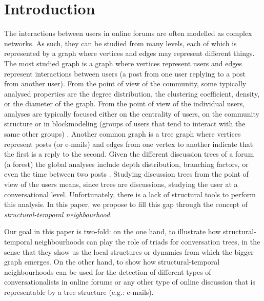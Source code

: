 \documentclass[conference]{IEEEtran}
\begin{document}
\section{Introduction}
The interactions between users in online forums are often modelled as complex networks. As such, they can be studied from many levels, each of which is represented by a graph where vertices and edges may represent different things. The most studied graph is a graph where vertices represent users and edges represent interactions between users (a post from one user replying to a post from another user). From the point of view of the community, some typically analysed properties are the degree distribution, the clustering coefficient, density, or the diameter of the graph. From the point of view of the individual users, analyses are typically focused either on the centrality of users, on the community structure or in blockmodeling (groups of users that tend to interact with the same other groups) \cite{McCallum2007a}. Another common graph is a tree graph where vertices represent posts (or e-mails) and edges from one vertex to another indicate that the first is a reply to the second. Given the different discussion trees of a forum (a forest) the global analyses include depth distribution, branching factors, or even the time between two posts \cite{Bhatt2012}. Studying discussion trees from the point of view of the users means, since trees are discussions, studying the user at a conversational level. Unfortunately, there is a lack of structural tools to perform this analysis. In this paper, we propose to fill this gap through the concept of \textit{structural-temporal neighbourhood}.  

Our goal in this paper is two-fold: on the one hand, to illustrate how structural-temporal neighbourhoods can play the role of triads for conversation trees, in the sense that they show us the local structures or dynamics from which the bigger graph emerges. On the other hand, to show how structural-temporal neighbourhoods can be used for the detection of different types of conversationalists in online forums or any other type of online discussion that is representable by a tree structure (e.g.: e-mails).
\end{document}
